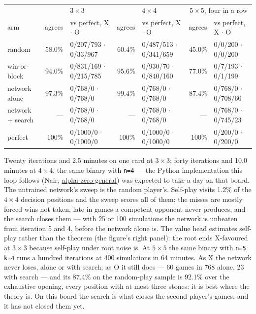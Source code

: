 \begin{center}
\small
\begin{tabular}{@{}l r l r l r l@{}}
\hline
 & \multicolumn{2}{c}{$3 \times 3$} & \multicolumn{2}{c}{$4 \times 4$} & \multicolumn{2}{c}{$5 \times 5$, four in a row} \\
arm & agrees & vs perfect, X $\cdot$ O & agrees & vs perfect, X $\cdot$ O & agrees & vs perfect, X $\cdot$ O \\
\hline
random           & 58.0\% & 0/207/793 $\cdot$ 0/33/967   & 60.4\% & 0/487/513 $\cdot$ 0/341/659 & 45.0\% & 0/0/200 $\cdot$ 0/0/200 \\
win-or-block     & 94.0\% & 0/831/169 $\cdot$ 0/215/785  & 95.6\% & 0/930/70 $\cdot$ 0/840/160  & 77.0\% & 0/7/193 $\cdot$ 0/1/199 \\
network alone    & $\mathbf{97.3\%}$ & 0/768/0 $\cdot$ 0/768/0 & $\mathbf{99.4\%}$ & 0/768/0 $\cdot$ 0/768/0 & $\mathbf{87.4\%}$ & 0/768/0 $\cdot$ 0/708/60 \\
network + search & ---    & 0/768/0 $\cdot$ 0/768/0      & ---    & 0/768/0 $\cdot$ 0/768/0      & ---    & 0/768/0 $\cdot$ 0/745/23 \\
perfect          & 100\%  & 0/1000/0 $\cdot$ 0/1000/0    & 100\%  & 0/1000/0 $\cdot$ 0/1000/0    & 100\%  & 0/200/0 $\cdot$ 0/200/0 \\
\hline
\end{tabular}
\end{center}

\noindent Twenty iterations and 2.5 minutes on one card at $3 \times 3$; forty
iterations and 10.0 minutes at $4 \times 4$, the same binary with \texttt{n=4} ---
the Python implementation this loop follows (Nair,
\href{https://github.com/suragnair/alpha-zero-general}{alpha-zero-general}) was expected to take a day on that
board. The untrained network's sweep is the random player's. Self-play visits 1.2\%
of the $4 \times 4$ decision positions and the sweep scores all of them; the misses
are mostly forced wins not taken, late in games a competent opponent never produces,
and the search closes them --- with 25 or 100 simulations the network is unbeaten
from iteration 5 and 4, before the network alone is. The value head estimates
self-play rather than the theorem (the figure's right panel): the root ends
X-favoured at $3 \times 3$ because self-play under root noise is. At $5 \times 5$
the same binary with \texttt{n=5 k=4} runs a hundred iterations at 400 simulations
in 64 minutes. As X the network never loses, alone or with search; as O it still
does --- 60 games in 768 alone, 23 with search --- and its 87.4\% on the random-play
sample is 92.1\% over the exhaustive opening, every position with at most three
stones: it is best where the theory is. On this board the search is what closes the
second player's games, and it has not closed them yet.

